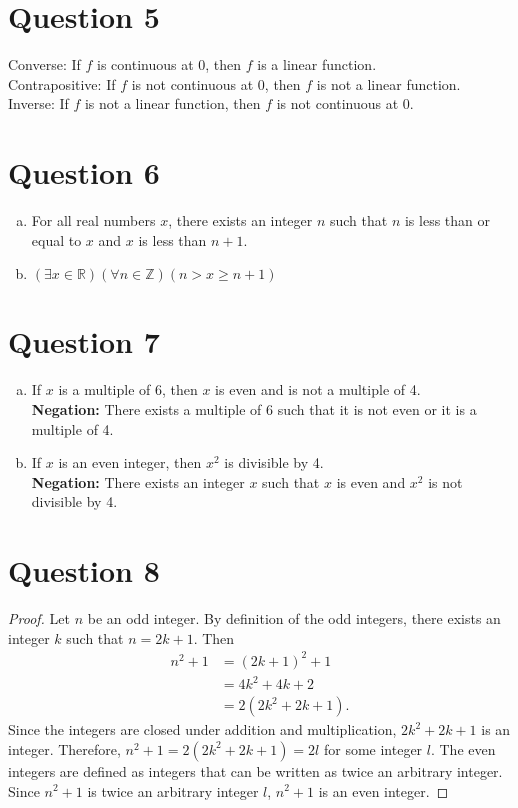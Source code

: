 \documentclass{article}
\begin{document}
\section*{Question 5}
Converse: If $f$ is continuous at 0, then $f$ is a linear function. \\
Contrapositive: If $f$ is not continuous at 0, then $f$ is not a linear function. \\
Inverse: If $f$ is not a linear function, then $f$ is not continuous at 0. \\

\section*{Question 6}
\begin{enumerate}[(a)]
    \item For all real numbers $x$, there exists an integer $n$ such that $n$ is less than or equal to $x$ and $x$ is less than $n+1$.
    \item $(\exists x \in \mathbb{R}) (\forall n \in \mathbb{Z}) (n > x \geq n + 1)$
\end{enumerate}

\section*{Question 7}
\begin{enumerate}[(a)]
    \item If $x$ is a multiple of 6, then $x$ is even and is not a multiple of 4. \\
        \textbf{Negation:} There exists a multiple of 6 such that it is not even or it is a multiple of 4.
    \item If $x$ is an even integer, then $x^2$ is divisible by 4. \\
        \textbf{Negation:} There exists an integer $x$ such that $x$ is even and $x^2$ is not divisible by 4.
\end{enumerate}

\section*{Question 8}
\begin{proof}
    Let $n$ be an odd integer.
    By definition of the odd integers, there exists an integer $k$ such that $n = 2k + 1$.
    Then \begin{align*}
        n^2 + 1 &= (2k + 1)^2 + 1 \\
                &= 4k^2 + 4k + 2 \\
                &= 2(2k^2 + 2k + 1).
    \end{align*}
    Since the integers are closed under addition and multiplication, $2k^2 + 2k + 1$ is an integer.
    Therefore, $n^2 + 1 = 2(2k^2 + 2k + 1) = 2l$ for some integer $l$.
    The even integers are defined as integers that can be written as twice an arbitrary integer.
    Since $n^2 + 1$ is twice an arbitrary integer $l$, $n^2 + 1$ is an even integer.
\end{proof}
\end{document}
